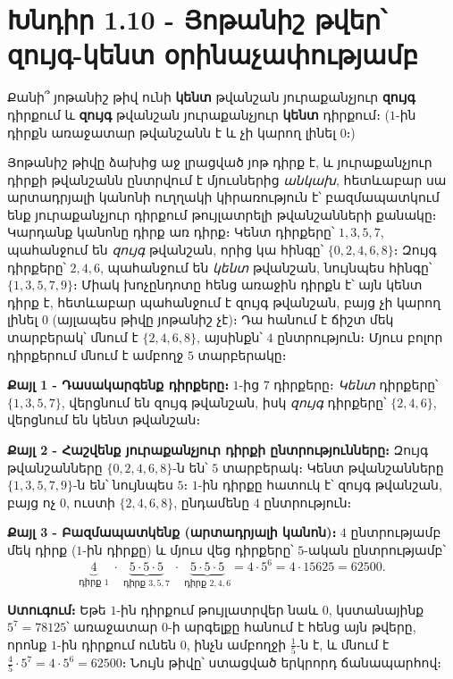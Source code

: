 \documentclass[11pt,a4paper]{article}
\begin{document}
\section*{Խնդիր 1.10 - Յոթանիշ թվեր՝ զույգ-կենտ օրինաչափությամբ}

\begin{problembox}[1.10]
Քանի՞ յոթանիշ թիվ ունի \textbf{կենտ} թվանշան յուրաքանչյուր \textbf{զույգ} դիրքում և
\textbf{զույգ} թվանշան յուրաքանչյուր \textbf{կենտ} դիրքում։ ($1$-ին դիրքն առաջատար թվանշանն է և չի
կարող լինել $0$։)
\end{problembox}

\begin{ideabox}
Յոթանիշ թիվը ձախից աջ լրացված յոթ դիրք է, և յուրաքանչյուր դիրքի թվանշանն ընտրվում է
մյուսներից \emph{անկախ}, հետևաբար սա արտադրյալի կանոնի ուղղակի կիրառություն է՝ բազմապատկում ենք յուրաքանչյուր
դիրքում թույլատրելի թվանշանների քանակը։ Կարդանք կանոնը դիրք առ դիրք։ Կենտ դիրքերը՝ $1,3,5,7$,
պահանջում են \emph{զույգ} թվանշան, որից կա հինգը՝ $\{0,2,4,6,8\}$։ Զույգ դիրքերը՝ $2,4,6$, պահանջում
են \emph{կենտ} թվանշան, նույնպես հինգը՝ $\{1,3,5,7,9\}$։ Միակ խոչընդոտը հենց առաջին դիրքն է՝ այն
կենտ դիրք է, հետևաբար պահանջում է զույգ թվանշան, բայց չի կարող լինել $0$ (այլապես թիվը
յոթանիշ չէ)։ Դա հանում է ճիշտ մեկ տարբերակ՝ մնում է $\{2,4,6,8\}$, այսինքն՝ $4$ ընտրություն։ Մյուս
բոլոր դիրքերում մնում է ամբողջ $5$ տարբերակը։
\end{ideabox}

\textbf{Քայլ 1 - Դասակարգենք դիրքերը։}
$1$-ից $7$ դիրքերը։ \emph{Կենտ} դիրքերը՝ $\{1,3,5,7\}$, վերցնում են զույգ թվանշան, իսկ \emph{զույգ}
դիրքերը՝ $\{2,4,6\}$, վերցնում են կենտ թվանշան։

\textbf{Քայլ 2 - Հաշվենք յուրաքանչյուր դիրքի ընտրությունները։}
Զույգ թվանշանները $\{0,2,4,6,8\}$-ն են՝ $5$ տարբերակ։ Կենտ թվանշանները $\{1,3,5,7,9\}$-ն են՝ նույնպես $5$։
$1$-ին դիրքը հատուկ է՝ զույգ թվանշան, բայց ոչ $0$, ուստի $\{2,4,6,8\}$, ընդամենը $4$ ընտրություն։

\textbf{Քայլ 3 - Բազմապատկենք (արտադրյալի կանոն)։}
$4$ ընտրությամբ մեկ դիրք ($1$-ին դիրքը) և մյուս վեց դիրքերը՝ $5$-ական ընտրությամբ՝
\[
\underbrace{4}_{\text{դիրք }1}\;\cdot\;\underbrace{5\cdot5\cdot5}_{\text{դիրք }3,5,7}\;\cdot\;\underbrace{5\cdot5\cdot5}_{\text{դիրք }2,4,6}
= 4\cdot 5^{6} = 4\cdot 15625 = 62500 .
\]

\textbf{Ստուգում։} Եթե $1$-ին դիրքում թույլատրվեր նաև $0$, կստանայինք $5^7=78125$՝ առաջատար $0$-ի
արգելքը հանում է հենց այն թվերը, որոնք $1$-ին դիրքում ունեն $0$, ինչն ամբողջի $\tfrac15$-ն է, և մնում է
$\tfrac45\cdot 5^7 = 4\cdot 5^6 = 62500$։ Նույն թիվը՝ ստացված երկրորդ ճանապարհով։ \checkmark
\end{document}
